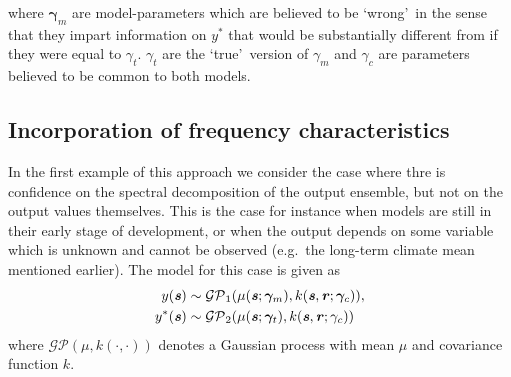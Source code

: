 \documentclass[10pt,a4paper]{article}
\newcommand{\thetab} {{\boldsymbol{\theta}}}
\newcommand{\varthetab} {{\boldsymbol{\vartheta}}}
\newcommand{\gammab} {\boldsymbol{\gamma}}
\newcommand{\svec} {\textbf{\textit{s}}}
\newcommand{\rvec} {\textbf{\textit{r}}}
\begin{document}
\noindent where $\gammab_m$ are model-parameters which are believed to be \lq wrong\rq~in the sense that they impart information on $y^*$ that would be substantially different from if they were equal to  $\gamma_t$. $\gamma_t$ are the \lq true\rq~version of $\gamma_m$ and $\gamma_c$ are parameters believed to be common to both models. 




\subsection{Incorporation of frequency characteristics}

In the first example of this approach we consider the case where thre is confidence on the spectral decomposition of the output ensemble, but not on the output values themselves. This is the case for instance when models are still in their early stage of development, or when the output depends on some variable which is unknown and cannot be observed (e.g.~the long-term climate mean mentioned earlier). The model for this case is given as
\begin{align}
y(\svec) &\sim \mathcal{GP}_1(\mu(\svec;\gammab_m), k(\svec,\rvec;\gammab_c)), \\
y^*(\svec) &\sim \mathcal{GP}_2(\mu(\svec;\gammab_t), k(\svec,\rvec;\gamma_c))
\end{align}
\noindent where $\mathcal{GP}(\mu,k(\cdot,\cdot))$ denotes a Gaussian process with mean $\mu$ and covariance function $k$. 
\end{document}
